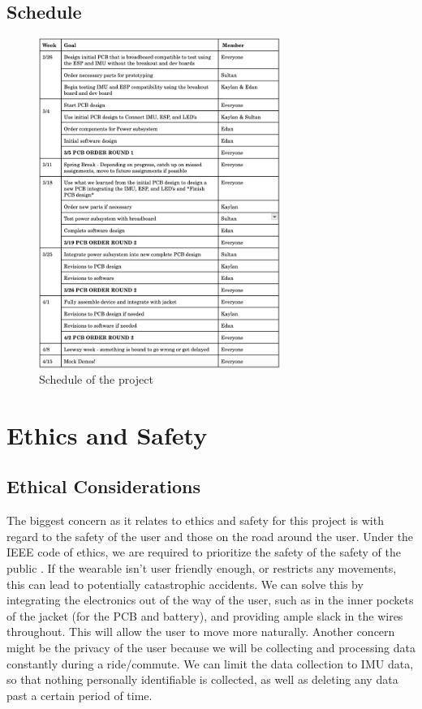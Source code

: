 \documentclass[12pt]{article}
\begin{document}
\newpage
\subsection{Schedule}
\begin{figure}[ht]
    \centering
    \includegraphics[width=0.70\textwidth]{schedule.png}
    \caption{Schedule of the project}
    \label{fig:my_label3}
\end{figure}
\section{Ethics and Safety}
\subsection{Ethical Considerations}
The biggest concern as it relates to ethics and safety for 
this project is with regard to the safety of the user and 
those on the road around the user. Under the IEEE code of 
ethics, we are required to prioritize the safety of the 
safety of the public \cite{IEEEethics2024}. If the wearable isn’t user
friendly enough, or restricts any movements, this can lead 
to potentially catastrophic accidents. We can solve this by 
integrating the electronics out of the way of the user, 
such as in the inner pockets of the jacket (for the PCB 
and battery), and providing ample slack in the wires 
throughout. This will allow the user to move more naturally.
Another concern might be the privacy of the user \cite{IEEEethics2024}
because we will be collecting and processing data constantly 
during a ride/commute. We can limit the data collection to 
IMU data, so that nothing personally identifiable is
collected, as well as deleting any data past a certain 
period of time. 
\end{document}
